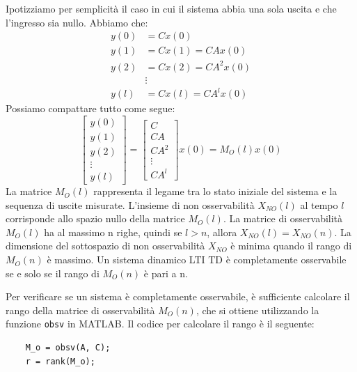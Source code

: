 \begin{tcolorbox}
    Ipotizziamo per semplicità il caso in cui il sistema abbia una sola uscita e che l'ingresso sia nullo.
    Abbiamo che:
    \begin{align*}
        y(0) & = C x(0)              \\
        y(1) & = C x(1) = C A x(0)   \\
        y(2) & = C x(2) = C A^2 x(0) \\
             & \vdots                \\
        y(l) & = C x(l) = C A^l x(0)
    \end{align*}
    Possiamo compattare tutto come segue:
    \begin{equation}
        \begin{bmatrix}
            y(0)   \\
            y(1)   \\
            y(2)   \\
            \vdots \\
            y(l)
        \end{bmatrix} =
        \begin{bmatrix}
            C      \\
            C A    \\
            C A^2  \\
            \vdots \\
            C A^l
        \end{bmatrix} x(0) = M_O(l) x(0)
    \end{equation}
    La matrice $M_O(l)$ rappresenta il legame tra lo stato iniziale del sistema e la sequenza di uscite misurate. L'insieme di non osservabilità $X_{NO}(l)$ al tempo $l$  corrisponde allo spazio nullo della matrice $M_O(l)$.
    La matrice di osservabilità $M_O(l)$ ha al massimo n righe, quindi se $l > n$, allora $X_{NO}(l) = X_{NO}(n)$. La dimensione del sottospazio di non osservabilità $X_{NO}$ è minima quando il rango di $M_O(n)$ è massimo. Un sistema dinamico LTI TD è completamente osservabile se e solo se il rango di $M_O(n)$ è pari a n.
    \begin{tcolorbox}[title=Matlab]
        Per verificare se un sistema è completamente osservabile, è sufficiente calcolare il rango della matrice di osservabilità $M_O(n)$, che si ottiene utilizzando la funzione \verb|obsv| in MATLAB. Il codice per calcolare il rango è il seguente:
        \begin{verbatim}
    M_o = obsv(A, C);
    r = rank(M_o);

\end{verbatim}
\end{tcolorbox}
\end{tcolorbox}
